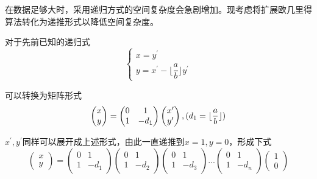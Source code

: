 \documentclass[UTF8,a4paper,10.5pt,twocolumn]{ctexart}
\begin{document}
	\indent \;
	\par 在数据足够大时，采用递归方式的空间复杂度会急剧增加。现考虑将扩展欧几里得算法转化为递推形式以降低空间复杂度。
	\par 对于先前已知的递归式\\
	$$
		\left\{
			\begin{array}{lr}
			x=y^{\prime}\\
			y=x^{\prime}-\lfloor\dfrac{a}{b}\rfloor y^{\prime}
			\end{array}
		\right.
	$$
	\par 可以转换为矩阵形式\\
	$$
		\left(\begin{matrix}
		x\\
		y
		\end{matrix}\right)
		=
		\left(\begin{matrix}
		0 & 1\\
		1 & -d_{1}
		\end{matrix}\right)
		\left(\begin{matrix}
		x^{\prime}\\
		y^{\prime}
		\end{matrix}\right),
		\space (d_{1}=\lfloor\dfrac{a}{b}\rfloor)
	$$
	\par $x^{\prime},y^{\prime}$同样可以展开成上述形式，由此一直递推到$x=1,y=0$，形成下式\\

	$$  
		\left(\begin{matrix}x\\y\end{matrix}\right)
		=
		\left(\begin{matrix}0 & 1\\1 & -d_{1}\end{matrix}\right)
		\left(\begin{matrix}0 & 1\\1 & -d_{2}\end{matrix}\right)
		\left(\begin{matrix}0 & 1\\1 & -d_{3}\end{matrix}\right)
		...
		\left(\begin{matrix}0 & 1\\1 & -d_{n}\end{matrix}\right)
		\left(\begin{matrix}1\\0\end{matrix}\right)
	$$
\end{document}
